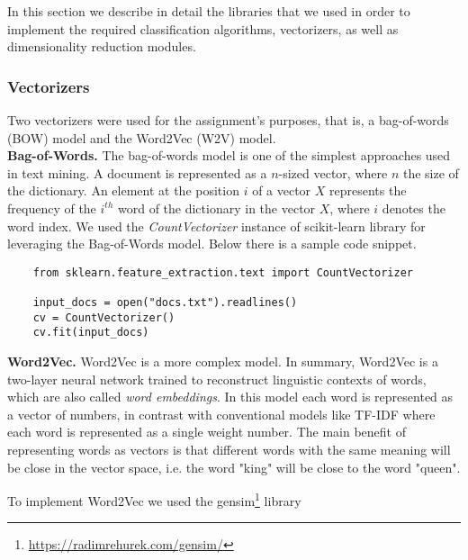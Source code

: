 In this section we describe in detail the libraries that we used in order to implement the required classification algorithms, vectorizers, as well as dimensionality reduction modules.
%
\subsubsection{Vectorizers}
Two vectorizers were used for the assignment’s purposes, that is, a bag-of-words (BOW) model and the Word2Vec (W2V) model.
\\
\textbf{Bag-of-Words.} The bag-of-words\cite{BoW} model is one of the simplest approaches used in text mining. A document is represented as a $n$-sized vector, where $n$ the size of the dictionary. An element at the position $i$ of a vector $X$ represents the frequency of the $i^{th}$ word of the dictionary in the vector $X$, where $i$ denotes the word index. We used the \emph{CountVectorizer} instance of scikit-learn library for leveraging the Bag-of-Words model. Below there is a sample code snippet.
\begin{verbatim}
	from sklearn.feature_extraction.text import CountVectorizer
	
	input_docs = open("docs.txt").readlines()
	cv = CountVectorizer()
	cv.fit(input_docs)
\end{verbatim}
%
\textbf{Word2Vec.} Word2Vec\cite{mikolov2013distributed} is a more complex model. In summary, Word2Vec is a two-layer neural network trained to reconstruct linguistic contexts of words, which are also called \emph{word embeddings}\cite{WordEmbedding}. In this model each word is represented as a vector of numbers, in contrast with conventional models like TF-IDF where each word is represented as a single weight number. The main benefit of representing words as vectors is that different words with the same meaning will be close in the vector space, i.e. the word "king" will be close to the word "queen".

To implement Word2Vec we used the gensim\footnote{\url{https://radimrehurek.com/gensim/}} library